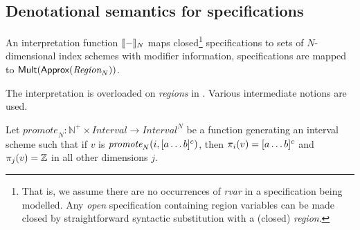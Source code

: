 \subsection{Denotational semantics for specifications}
\label{sec:semantics}

\noindent
An interpretation function $\llbracket{} {-} \rrbracket{}_N$ maps closed\footnote{That
  is, we assume there are no occurrences of \textit{rvar} in a
  specification being modelled.  Any \emph{open} specification
  containing region variables can be made closed by straightforward
  syntactic substitution with a (closed) \textit{region}.}
specifications to sets of $N$-dimensional index schemes with modifier
information, \ie{} specifications are mapped to
$\textsf{Mult} (\textsf{Approx} (\textnormal{$\textit{Region}_{N}$}))$.

The interpretation is overloaded on \emph{regions} in
. Various intermediate notions are used.

\begin{defn}
  Let $\textit{promote}_N : \mathbb{N}^+ \times \textit{Interval} \to
  \textit{Interval}^N$ be a function generating an interval scheme such that if
  $v$ is $\textnormal{$\textit{promote}_{N}(i,\textnormal{$\lbrack a\dots b\rbrack^{c}$})$}$, then $\pi_i(v) = \textnormal{$\lbrack a\dots b\rbrack^{c}$}$
  and $\pi_j(v) = \textnormal{$\mathbb{Z}$}{}$ in all other dimensions $j$.
\end{defn}

